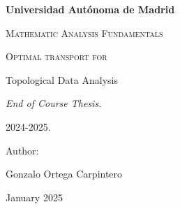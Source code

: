\documentclass[12pt, a4paper]{article}
\theoremstyle{definition}
\newcommand{\authorname}{Gonzalo Ortega Carpintero}
\newcommand{\institution}{Universidad Autónoma de Madrid}
\newcommand{\projecttitle}{Optimal transport for

Topological Data Analysis}
\begin{document}
\begin{titlepage}
    \centering
    \vspace{1cm}
    {\bfseries\LARGE \institution \par}
    \vspace{1cm}
    {\scshape\Large Mathematic Analysis Fundamentals \par}
    \vspace{3cm}
    {\scshape\Huge \projecttitle \par}
    \vspace{3cm}
    {\itshape\Large End of Course Thesis.
    
    2024-2025. \par}
    \vfill
    {\Large Author: \par}
    {\Large \authorname \par}
    \vfill
    {\Large January 2025 \par}
\end{titlepage}


\setlength{\parskip}{0.75em}
\renewcommand{\baselinestretch}{1.25}

\tableofcontents
\pagebreak


\pagebreak


\pagebreak


\pagebreak



\end{document}
